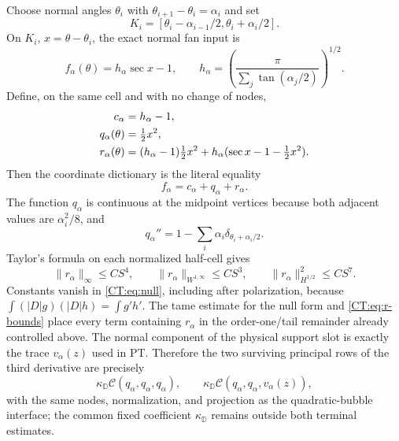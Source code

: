 \documentclass[11pt]{amsart}
\numberwithin{equation}{section}
\theoremstyle{definition}
\theoremstyle{remark}
\newcommand{\Dop}{|D|}
\newcommand{\Cnull}{\mathcal C}
\begin{document}
Choose normal angles $\theta_i$ with
$\theta_{i+1}-\theta_i=\alpha_i$ and set
\begin{equation}\label{CT:eq:cells}
 K_i=[\theta_i-\alpha_{i-1}/2,\theta_i+\alpha_i/2].
\end{equation}
On $K_i$, $x=\theta-\theta_i$, the exact normal fan input is
\begin{equation}\label{CT:eq:secant}
 f_\alpha(\theta)=h_\alpha\sec x-1,
 \qquad
 h_\alpha=\left(\frac{\pi}{\sum_j\tan(\alpha_j/2)}\right)^{1/2}.
\end{equation}
Define, on the same cell and with no change of nodes,
\begin{align}
 c_\alpha&=h_\alpha-1,\notag\\
 q_\alpha(\theta)&=\tfrac12x^2,\label{CT:eq:bubble}\\
 r_\alpha(\theta)&=(h_\alpha-1)\tfrac12x^2
 +h_\alpha(\sec x-1-\tfrac12x^2).\notag
\end{align}
Then the coordinate dictionary is the literal equality
\begin{equation}\label{CT:eq:dictionary}
 \boxed{f_\alpha=c_\alpha+q_\alpha+r_\alpha.}
\end{equation}
The function $q_\alpha$ is continuous at the midpoint vertices because
both adjacent values are $\alpha_i^2/8$, and
\begin{equation}\label{CT:eq:q-distribution}
 q_\alpha''=1-\sum_i\alpha_i
 \delta_{\theta_i+\alpha_i/2}.
\end{equation}
Taylor's formula on each normalized half-cell gives
\begin{equation}\label{CT:eq:r-bounds}
 \|r_\alpha\|_\infty\le CS^4,\qquad
 \|r_\alpha\|_{W^{1,\infty}}\le CS^3,\qquad
 \|r_\alpha\|_{H^{1/2}}^2\le CS^7.
\end{equation}
Constants vanish in \eqref{CT:eq:null}, including after polarization, because
$\int(\Dop g)(\Dop h)=\int g'h'$.  The tame estimate for the null form and
\eqref{CT:eq:r-bounds} place every term containing $r_\alpha$ in the
order-one/tail remainder already controlled above.  The normal component
of the physical support slot is exactly the trace $v_\alpha(z)$ used in
PT.  Therefore the two surviving principal rows of the third derivative
are precisely
\begin{equation}\label{CT:eq:terminal-rows}
 \kappa_{\mathbb D}\Cnull(q_\alpha,q_\alpha,q_\alpha),
 \qquad
 \kappa_{\mathbb D}\Cnull(q_\alpha,q_\alpha,v_\alpha(z)),
\end{equation}
with the same nodes, normalization, and projection as the quadratic-bubble
interface; the common fixed coefficient $\kappa_{\mathbb D}$ remains
outside both terminal estimates.
\end{document}
